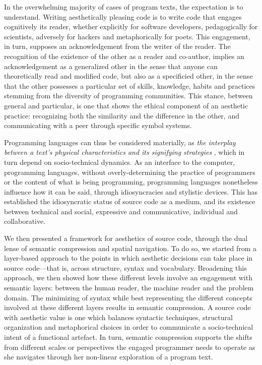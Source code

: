In the overwhelming majority of cases of program texts, the expectation is to understand. Writing aesthetically pleasing code is to write code that engages cognitively its reader, whether explicitly for software developers, pedagogically for scientists, adversely for hackers and metaphorically for poets. This engagement, in turn, supposes an acknowledgement from the writer of the reader. The recognition of the existence of the other as a reader and co-author, implies an acknowledgement as a generalized other in the sense that anyone can theoretically read and modified code, but also as a specificied other, in the sense that the other possesses a particular set of skills, knowledge, habits and practices stemming from the diversity of programming communities. This stance, between general and particular, is one that shows the ethical component of an aesthetic practice: recognizing both the similarity and the difference in the other, and communicating with a peer through specific symbol systems.

\spacer

Programming languages can thus be considered materially, as \emph{the interplay between a text’s physical characteristics and its signifying strategies} \citep{hayles_print_2004}, which in turn depend on socio-technical dynamics. As an interface to the computer, programming languages, without overly-determining the practice of programmers or the content of what is being programming, programming languages nonetheless influence how it can be said, through idiosyncracies and stylistic devices. This has established the idiosyncratic status of source code as a medium, and its existence between technical and social, expressive and communicative, individual and collaborative.

We then presented a framework for aesthetics of source code, through the dual lense of semantic compression and spatial navigation. To do so, we started from a layer-based approach to the points in which aesthetic decisions can take place in source code—that is, across structure, syntax and vocabulary. Broadening this approach, we then showed how these different levels involve an engagement with semantic layers: between the human reader, the machine reader and the problem domain. The minimizing of syntax while best representing the different concepts involved at these different layers results in semantic compression. A source code with aesthetic value is one which balances syntactic techniques, structural organization and metaphorical choices in order to communicate a socio-technical intent of a functional artefact. In turn, semantic compression supports the shifts from different scales or perspectives the engaged programmer needs to operate as she navigates through her non-linear exploration of a program text.

